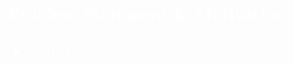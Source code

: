 
\begin{frame}
  \frametitle{\textcolor{white}{\bf Problem Statement \& Motivation}}
  \textcolor{white}{
    \begin{itemize}
        \item write here
    \end{itemize}
  }
\end{frame}
